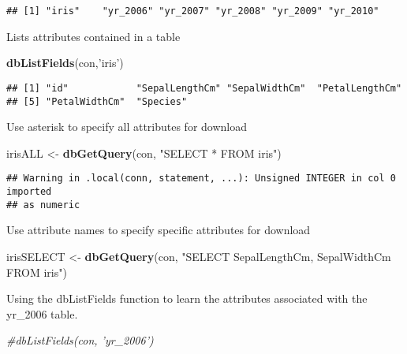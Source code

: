 \documentclass[]{article}
\newenvironment{Shaded}{\begin{snugshade}}{\end{snugshade}}
\newcommand{\CommentTok}[1]{\textcolor[rgb]{0.56,0.35,0.01}{\textit{#1}}}
\newcommand{\KeywordTok}[1]{\textcolor[rgb]{0.13,0.29,0.53}{\textbf{#1}}}
\newcommand{\NormalTok}[1]{#1}
\newcommand{\StringTok}[1]{\textcolor[rgb]{0.31,0.60,0.02}{#1}}
\begin{document}
\begin{verbatim}
## [1] "iris"    "yr_2006" "yr_2007" "yr_2008" "yr_2009" "yr_2010"
\end{verbatim}

Lists attributes contained in a table

\begin{Shaded}
\begin{Highlighting}[]
\KeywordTok{dbListFields}\NormalTok{(con,}\StringTok{'iris'}\NormalTok{)}
\end{Highlighting}
\end{Shaded}

\begin{verbatim}
## [1] "id"            "SepalLengthCm" "SepalWidthCm"  "PetalLengthCm"
## [5] "PetalWidthCm"  "Species"
\end{verbatim}

Use asterisk to specify all attributes for download

\begin{Shaded}
\begin{Highlighting}[]
\NormalTok{irisALL <-}\StringTok{ }\KeywordTok{dbGetQuery}\NormalTok{(con, }\StringTok{"SELECT * FROM iris"}\NormalTok{)}
\end{Highlighting}
\end{Shaded}

\begin{verbatim}
## Warning in .local(conn, statement, ...): Unsigned INTEGER in col 0 imported
## as numeric
\end{verbatim}

Use attribute names to specify specific attributes for download

\begin{Shaded}
\begin{Highlighting}[]
\NormalTok{irisSELECT <-}\StringTok{ }\KeywordTok{dbGetQuery}\NormalTok{(con, }\StringTok{"SELECT SepalLengthCm, SepalWidthCm FROM iris"}\NormalTok{)}
\end{Highlighting}
\end{Shaded}

Using the dbListFields function to learn the attributes associated with
the yr\_2006 table.

\begin{Shaded}
\begin{Highlighting}[]
\CommentTok{#dbListFields(con, 'yr_2006')}
\end{Highlighting}
\end{Shaded}
\end{document}
